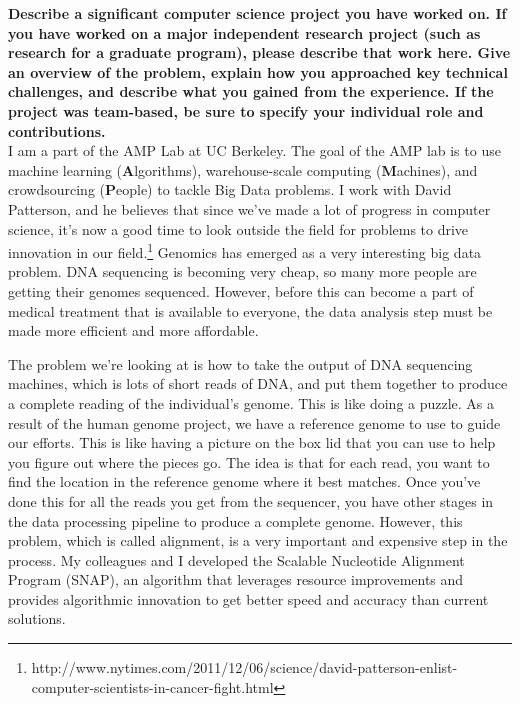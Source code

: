 \documentclass{article}
\begin{document}
	
\pagestyle{plain}

\textbf{Describe a significant computer science project you have worked on. If you have worked on a major independent research project (such as research for a graduate program), please describe that work here. Give an overview of the problem, explain how you approached key technical challenges, and describe what you gained from the experience. If the project was team-based, be sure to specify your individual role and contributions.}\\

I am a part of the AMP Lab at UC Berkeley.
The goal of the AMP lab is to use machine learning (\textbf{A}lgorithms), warehouse-scale computing (\textbf{M}achines), and crowdsourcing (\textbf{P}eople) to tackle Big Data problems.
I work with David Patterson, and he believes that since we've made a lot of progress in computer science, it's now a good time to look outside the field for problems to drive innovation in our field.\footnote{http://www.nytimes.com/2011/12/06/science/david-patterson-enlist-computer-scientists-in-cancer-fight.html} %
Genomics has emerged as a very interesting big data problem.  %
DNA sequencing is becoming very cheap, so many more people are getting their genomes sequenced. %
However, before this can become a part of medical treatment that is available to everyone, the data analysis step must be made more efficient and more affordable.  %

The problem we're looking at is how to take the output of DNA sequencing machines, which is lots of short reads of DNA, and put them together to produce a complete reading of the individual's genome.
This is like doing a puzzle.
As a result of the human genome project, we have a reference genome to use to guide our efforts.
This is like having a picture on the box lid that you can use to help you figure out where the pieces go.
The idea is that for each read, you want to find the location in the reference genome where it best matches.
Once you've done this for all the reads you get from the sequencer, you have other stages in the data processing pipeline to produce a complete genome.
However, this problem, which is called alignment, is a very important and expensive step in the process.
My colleagues and I developed the Scalable Nucleotide Alignment Program (SNAP), an algorithm that leverages resource improvements and provides algorithmic innovation to get better speed and accuracy than current solutions.
\end{document}
